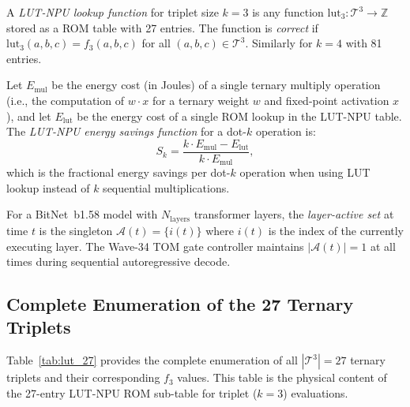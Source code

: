 \begin{definition}
\label{def:lut_lookup}
A \emph{LUT-NPU lookup function} for triplet size $k=3$ is any function
$\mathrm{lut}_3 : \mathcal{T}^3 \to \mathbb{Z}$ stored as a ROM table with
27 entries.  The function is \emph{correct} if $\mathrm{lut}_3(a,b,c) = f_3(a,b,c)$
for all $(a,b,c) \in \mathcal{T}^3$.  Similarly for $k=4$ with 81 entries.
\end{definition}

\begin{definition}
\label{def:energy_savings}
Let $E_{\mathrm{mul}}$ be the energy cost (in Joules) of a single ternary
multiply operation (i.e., the computation of $w \cdot x$ for a ternary weight
$w$ and fixed-point activation $x$), and let $E_{\mathrm{lut}}$ be the energy
cost of a single ROM lookup in the LUT-NPU table.  The \emph{LUT-NPU energy
savings function} for a dot-$k$ operation is:
\[
  S_k = \frac{k \cdot E_{\mathrm{mul}} - E_{\mathrm{lut}}}{k \cdot E_{\mathrm{mul}}},
\]
which is the fractional energy savings per dot-$k$ operation when using
LUT lookup instead of $k$ sequential multiplications.
\end{definition}

\begin{definition}
\label{def:layer_active}
For a BitNet~b1.58 model with $N_{\mathrm{layers}}$ transformer layers,
the \emph{layer-active set} at time $t$ is the singleton
$\mathcal{A}(t) = \{i(t)\}$ where $i(t)$ is the index of the currently
executing layer.  The Wave-34 TOM gate controller maintains $|\mathcal{A}(t)| = 1$
at all times during sequential autoregressive decode.
\end{definition}

\subsection{Complete Enumeration of the 27 Ternary Triplets}

Table~\ref{tab:lut_27} provides the complete enumeration of all
$|\mathcal{T}^3| = 27$ ternary triplets and their corresponding
$f_3$ values.  This table is the physical content of the 27-entry
LUT-NPU ROM sub-table for triplet ($k=3$) evaluations.

